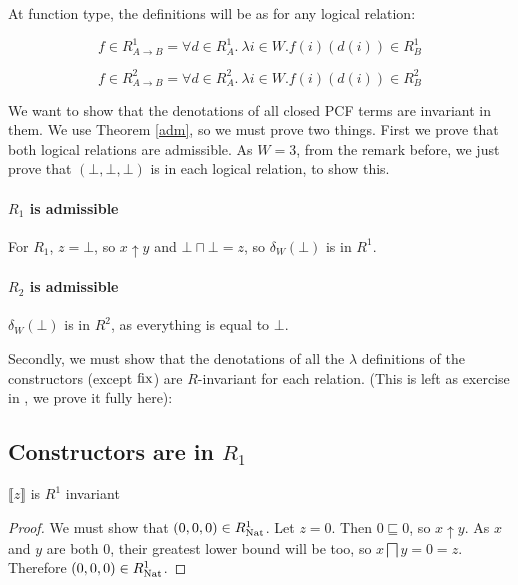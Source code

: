 At function type, the definitions will be as for any logical relation:

\[ f \in R_{A \to B}^1 = \forall d \in R_A^1. \ \lambda i \in W. f(i)(d(i)) \in R_B^1 \]

\[ f \in R_{A \to B}^2 = \forall d \in R_A^2. \ \lambda i \in W. f(i)(d(i)) \in R_B^2 \]

We want to show that the denotations of all closed PCF terms are invariant in them. We use Theorem \ref{adm}, so we must prove two things. First we prove that both logical relations are admissible. As $W = 3$, from the remark before, we just prove that $(\bot, \bot, \bot)$ is in each logical relation, to show this.

\paragraph{$R_1$ is admissible} For $R_1$, $z = \bot$, so $x \uparrow y$ and $\bot \sqcap \bot = z$, so $\delta_W(\bot)$ is in $R^1$.


\paragraph{$R_2$ is admissible}

$\delta_W(\bot)$ is in $R^2$, as everything is equal to $\bot$.


Secondly, we must show that the denotations of all the $\lambda$ definitions of the constructors (except $\operatorname{fix}$) are $R$-invariant for each relation. (This is left as exercise in \citep{Streicher06}, we prove it fully here):


\subsection{Constructors are in $R_1$}

\begin{lem}
$\llbracket z \rrbracket$ is $R^1$ invariant
\end{lem}

\vspace{0.25cm}

\begin{proof} We must show that $(0,0,0) \in R_{\operatorname{Nat}}^1$. Let $z = 0$. Then $0 \sqsubseteq 0$, so $x \uparrow y$. As $x$ and $y$ are both $0$, their greatest lower bound will be too, so $x \bigsqcap y = 0 = z$. Therefore $(0,0,0) \in R_{\operatorname{Nat}}^1$.
\end{proof}

